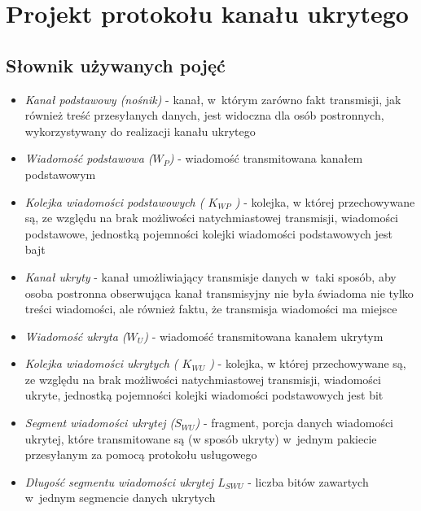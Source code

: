 \documentclass[a4paper, twoside, 12pt]{report}
\begin{document}
\chapter{Projekt protokołu kanału ukrytego}
    \section{Słownik używanych pojęć} \label{DICT}
    \begin{itemize}
        \item \emph{Kanał podstawowy (nośnik)} - kanał, w~którym zarówno fakt transmisji,
            jak również treść przesyłanych danych, jest widoczna dla osób postronnych,
            wykorzystywany do realizacji kanału ukrytego

        \item \emph{Wiadomość podstawowa (\(W_P\))} - wiadomość transmitowana kanałem
            podstawowym

        \item \emph{Kolejka wiadomości podstawowych ( \( K_{WP} \) )} - kolejka, w
                której przechowywane są, ze względu na brak możliwości natychmiastowej
                transmisji, wiadomości podstawowe, jednostką pojemności kolejki
                wiadomości podstawowych jest bajt

        \item \emph{Kanał ukryty} - kanał umożliwiający transmisje danych w~taki sposób,
            aby osoba postronna obserwująca kanał transmisyjny nie była świadoma
            nie tylko treści wiadomości, ale również faktu, że transmisja wiadomości ma miejsce

        \item \emph{Wiadomość ukryta (\(W_U\))} - wiadomość transmitowana kanałem ukrytym

        \item \emph{Kolejka wiadomości ukrytych ( \( K_{WU} \) )} - kolejka, w
                której przechowywane są, ze względu na brak możliwości natychmiastowej
                transmisji, wiadomości ukryte, jednostką pojemności kolejki
                wiadomości podstawowych jest bit

        \item \emph{Segment wiadomości ukrytej (\(S_{WU}\))} - fragment, porcja danych
            wiadomości ukrytej, które transmitowane są (w sposób ukryty) w~jednym
            pakiecie przesyłanym za pomocą protokołu usługowego

        \item \emph{Długość segmentu wiadomości ukrytej \( L_{SWU} \)} - liczba
                bitów zawartych w~jednym segmencie danych ukrytych


\end{itemize}
\end{document}
